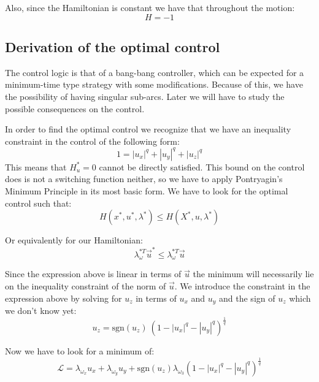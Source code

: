 Also, since the Hamiltonian is constant we have that throughout the motion:
\begin{equation}
 H = -1
\end{equation}

\subsection{Derivation of the optimal control}
The control logic is that of a bang-bang controller, which can be expected for a minimum-time type strategy with some modifications. Because of this, we have the possibility of having singular sub-arcs. Later we will have to study the possible consequences on the control.

In order to find the optimal control we recognize that we have an inequality constraint in the control of the following form:
\begin{equation}
1 =  |u_x|^q + |u_y|^q + |u_z|^q
\end{equation}
This means that $H_u^*=0$ cannot be directly satisfied. This bound on the control does is not a switching function neither, so we have to apply Pontryagin's Minimum Principle in its most basic form. We have to look for the optimal control such that:
\begin{equation}
H(x^*, u^*, \lambda^*) \leq H(X^*, u, \lambda^*)
\end{equation}

Or equivalently for our Hamiltonian:
\begin{equation}
\lambda_\omega^{*T} \vec{u}^* \leq \lambda_\omega^{*T} \vec{u}
\end{equation}

Since the expression above is linear in terms of $\vec{u}$ the minimum will necessarily lie on the inequality constraint of the norm of $\vec{u}$. We introduce the constraint in the expression above by solving for $u_z$ in terms of $u_x$ and $u_y$ and the sign of $u_z$ which we don't know yet:
\begin{equation}
\label{uzFromNorm}
u_z = \text{sgn}(u_z) \ (1 - |u_x|^q - |u_y|^q)^{\frac{1}{q}}
\end{equation}

Now we have to look for a minimum of:
\begin{equation}
\label{unconstrainedOptimalControl}
\mathcal{L} = \lambda_{\omega_x} u_x + \lambda_{\omega_y} u_y + \text{sgn}(u_z) \lambda_{\omega_3} (1 - |u_x|^q - |u_y|^q)^{\frac{1}{q}}
\end{equation}

